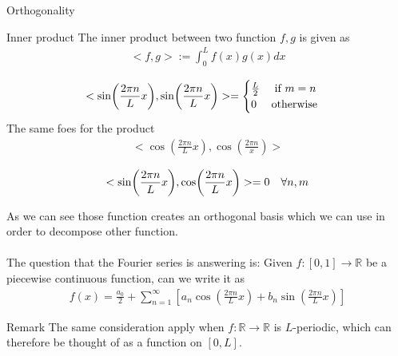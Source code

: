 \begin{parag}{Orthogonality}
	\begin{definition}{Inner product}
    The inner product between two function $f, g$ is given as 
	\begin{align*} 
		< f, g> := \int_{0}^{L}f\left(x\right)g\left(x\right) dx
	\end{align*}
	\end{definition}
	\begin{align*} 
		< \sin\left(\frac{2\pi n}{L}x\right), \sin\left(\frac{2\pi n}{L}x\right)> =  \begin{cases}
		\frac{L}{2} \mathspace \text{ if } m = n\\
			0 \mathspace \text{ otherwise}
		\end{cases}	\end{align*}
		The same foes for the product 
		\begin{align*} 
			< \cos\left(\frac{2\pi n}{L}x\right), \cos \left(\frac{2\pi n}{x}\right)>
		\end{align*}
		\begin{theoreme}
		\begin{align*} 
			<\sin\left(\frac{2\pi n}{L}x\right), \cos \left(\frac{2\pi n}{L}x\right)> =  0 \mathspace \forall n, m
		\end{align*}
		\end{theoreme}
		As we can see those function creates an orthogonal basis which we can use in order to decompose other function. \\
		$ $\\
		The question that the Fourier series is answering is: Given $f: \left[0, 1\right] \to \mathbb{R}$ be a piecewise continuous function, can we write it as 
		\begin{align*} 
			f\left(x\right) = \frac{a_0}{2} + \sum_{n = 1}^{\infty}\left[a_n \cos\left(\frac{2\pi n}{L}x\right) + b_n \sin\left(\frac{2\pi n}{L}x\right)\right]
		\end{align*}
		\begin{subparag}{Remark}
		    The same consideration apply when $f: \mathbb{R} \to \mathbb{R}$ is $L$-periodic, which can therefore be thought of as a function on $\left[0, L\right]$.
		\end{subparag}
\end{parag}






